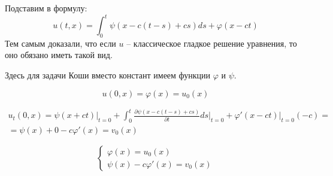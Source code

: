 \documentclass[12pt]{report}
\begin{document}
 Подставим в формулу: 
    $$
        u(t, x) = \int^{t}_{0}{\psi(x - c(t - s) + cs)ds} + \varphi (x - ct)
    $$
Тем самым доказали, что если $u$ -- классическое гладкое решение уравнения, то оно обязано иметь такой вид. 

Здесь для задачи Коши вместо констант имеем функции $\varphi$ и $\psi$.

$$u(0, x) = \varphi(x) = u_0(x)$$

$$
\begin{gathered}
    u_t(0, x) = \psi(x+ct) \vert_{t=0} + \int^{t}_{0}{\frac{\partial \psi(x - c(t - s) + cs)}{\partial t} ds} \vert_{t = 0} + \varphi ' (x - ct) \vert_{t = 0} (-c) =
    \\
    = \psi(x) + 0 - c \varphi ' (x) = v_0(x)
\end{gathered}
$$

\[
    \begin{cases}
        \varphi(x) = u_0(x)
        \\
        \psi(x) - c \varphi ' (x) = v_0(x)
    \end{cases}
\]
    
\end{document}
